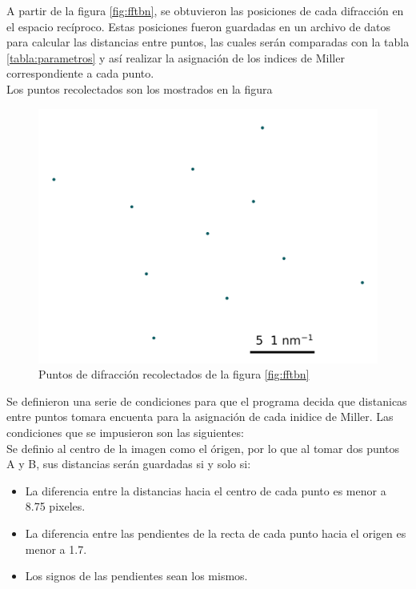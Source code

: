 \documentclass[reprint,amsmath,amssymb,aps,]{revtex4-2}
\begin{document}
A partir de la figura \ref{fig:fftbn}, se obtuvieron las posiciones de cada difracción en el espacio recíproco. Estas posiciones fueron guardadas en un archivo de datos para 
calcular las distancias entre puntos, las cuales serán comparadas con la tabla \ref{tabla:parametros} y así realizar la asignación de los indices de Miller correspondiente a cada punto.\\
 Los puntos recolectados son los mostrados en la figura
 \begin{figure}[H]
     \centering
     \includegraphics[scale=0.4]{../Graphics/inicial.png}
     \caption{Puntos de difracción recolectados de la figura \ref{fig:fftbn}}
     \label{fig:puntosiniciales}
 \end{figure}
 Se definieron una serie de condiciones para que el programa decida que distanicas entre puntos tomara encuenta para la asignación de cada inidice de Miller.
  Las condiciones que se impusieron son las 
siguientes:\\
Se definio al centro de la imagen como el órigen, por lo que al tomar dos puntos A y B, sus distancias serán guardadas si y solo si:
\begin{itemize}
    \item La diferencia entre la distancias hacia el centro de cada punto es menor a 8.75 pixeles.
    \item La diferencia entre las pendientes de la recta de cada punto hacia el origen es menor a 1.7.\\
    \item Los signos de las pendientes sean los mismos. 
\end{itemize}
\end{document}
